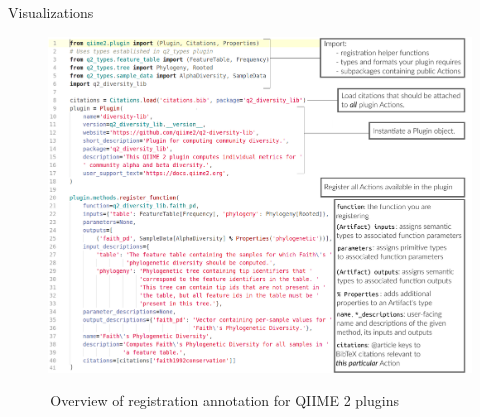 \documentclass[final]{beamer}
\newlength{\colwidth}
\begin{document}
\begin{frame}[t]
\begin{columns}[t]
\begin{column}{\colwidth}
\begin{block}{Visualizations}
    \begin{figure}[tph!]
    {\includegraphics[width=\textwidth]{assets/registrationDiagram}}
    \caption{\,Overview of registration annotation for QIIME 2 plugins}
    \label{fig:registrationDiagram}
    \end{figure}

  \end{block}


\end{column}
\end{columns}
\end{frame}
\end{document}
